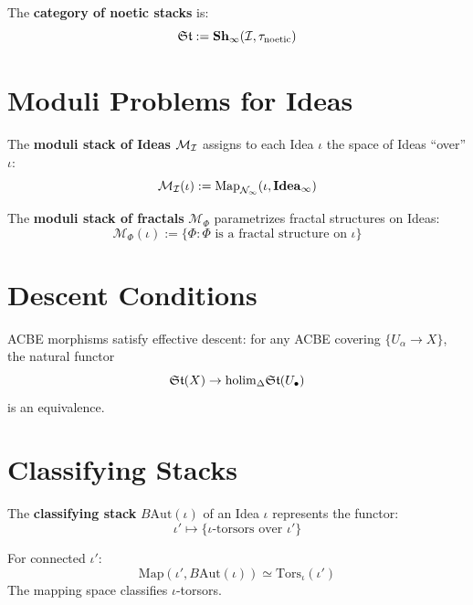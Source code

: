 \begin{definition}
\label{def:stack-category}
The \textbf{category of noetic stacks} is:
\[
\mathfrak{St} := \mathbf{Sh}_\infty(\mathcal{I}, \tau_{\mathrm{noetic}})
\]
\end{definition}

\section{Moduli Problems for Ideas}

\begin{definition}
\label{def:moduli-ideas}
The \textbf{moduli stack of Ideas} $\mathcal{M}_{\mathcal{I}}$ assigns to each Idea $\iota$
the space of Ideas ``over'' $\iota$:
\[
\mathcal{M}_{\mathcal{I}}(\iota) := \mathrm{Map}_{\mathcal{N}_\infty}(\iota, \mathbf{Idea}_\infty)
\]
\end{definition}

\begin{definition}
\label{def:moduli-fractals}
The \textbf{moduli stack of fractals} $\mathcal{M}_\Phi$ parametrizes fractal
structures on Ideas:
\[
\mathcal{M}_\Phi(\iota) := \{\Phi : \Phi \text{ is a fractal structure on } \iota\}
\]
\end{definition}

\section{Descent Conditions}

\begin{theorem}
\label{thm:acbe-descent}
ACBE morphisms satisfy effective descent: for any ACBE covering
$\{U_\alpha \to X\}$, the natural functor
\[
\mathfrak{St}(X) \to \mathrm{holim}_\Delta \mathfrak{St}(U_\bullet)
\]
is an equivalence.
\end{theorem}

\section{Classifying Stacks}

\begin{definition}
\label{def:classifying-stack}
The \textbf{classifying stack} $B\mathrm{Aut}(\iota)$ of an Idea $\iota$ represents
the functor:
\[
\iota' \mapsto \{\text{$\iota$-torsors over } \iota'\}
\]
\end{definition}

\begin{theorem}[Classification]
\label{thm:classification}
For connected $\iota'$:
\[
\mathrm{Map}(\iota', B\mathrm{Aut}(\iota)) \simeq \mathrm{Tors}_\iota(\iota')
\]
The mapping space classifies $\iota$-torsors.
\end{theorem}


